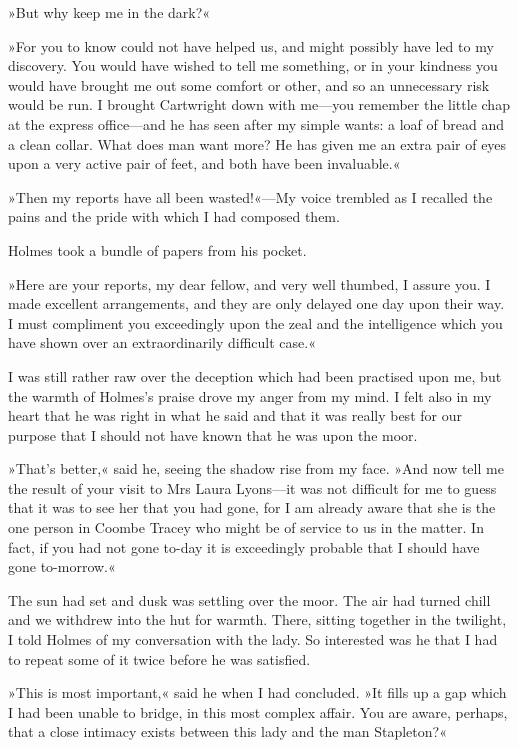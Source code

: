 »But why keep me in the dark?«

»For you to know could not have helped us, and might possibly have led to my discovery. You would have wished to tell me something, or in your kindness you would have brought me out some comfort or other, and so an unnecessary risk would be run. I brought Cartwright down with me—you remember the little chap at the express office—and he has seen after my simple wants: a loaf of bread and a clean collar. What does man want more? He has given me an extra pair of eyes upon a very active pair of feet, and both have been invaluable.«

»Then my reports have all been wasted!«—My voice trembled as I recalled the pains and the pride with which I had composed them.

Holmes took a bundle of papers from his pocket.

»Here are your reports, my dear fellow, and very well thumbed, I assure you. I made excellent arrangements, and they are only delayed one day upon their way. I must compliment you exceedingly upon the zeal and the intelligence which you have shown over an extraordinarily difficult case.«

I was still rather raw over the deception which had been practised upon me, but the warmth of Holmes's praise drove my anger from my mind. I felt also in my heart that he was right in what he said and that it was really best for our purpose that I should not have known that he was upon the moor.

»That's better,« said he, seeing the shadow rise from my face. »And now tell me the result of your visit to Mrs Laura Lyons—it was not difficult for me to guess that it was to see her that you had gone, for I am already aware that she is the one person in Coombe Tracey who might be of service to us in the matter. In fact, if you had not gone to-day it is exceedingly probable that I should have gone to-morrow.«

The sun had set and dusk was settling over the moor. The air had turned chill and we withdrew into the hut for warmth. There, sitting together in the twilight, I told Holmes of my conversation with the lady. So interested was he that I had to repeat some of it twice before he was satisfied.

»This is most important,« said he when I had concluded. »It fills up a gap which I had been unable to bridge, in this most complex affair. You are aware, perhaps, that a close intimacy exists between this lady and the man Stapleton?«

